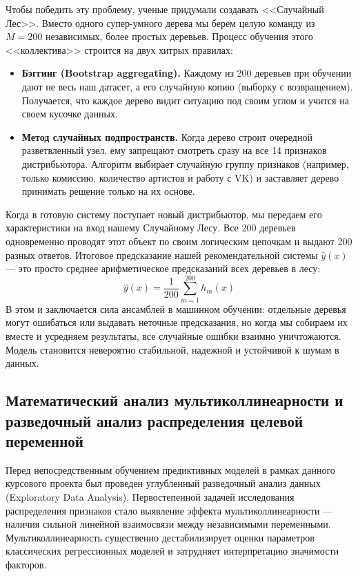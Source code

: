 \documentclass[14pt, a4paper]{extarticle}
\begin{document}
Чтобы победить эту проблему, ученые придумали создавать <<Случайный Лес>>. Вместо одного супер-умного дерева мы берем целую команду из $M = 200$ независимых, более простых деревьев. Процесс обучения этого <<коллектива>> строится на двух хитрых правилах:
\begin{itemize}
    \item \textbf{Бэггинг (Bootstrap aggregating).} Каждому из 200 деревьев при обучении дают не весь наш датасет, а его случайную копию (выборку с возвращением). Получается, что каждое дерево видит ситуацию под своим углом и учится на своем кусочке данных.
    \item \textbf{Метод случайных подпространств.} Когда дерево строит очередной разветвленный узел, ему запрещают смотреть сразу на все 14 признаков дистрибьютора. Алгоритм выбирает случайную группу признаков (например, только комиссию, количество артистов и работу с VK) и заставляет дерево принимать решение только на их основе.
\end{itemize}

Когда в готовую систему поступает новый дистрибьютор, мы передаем его характеристики на вход нашему Случайному Лесу. Все 200 деревьев одновременно проводят этот объект по своим логическим цепочкам и выдают 200 разных ответов. Итоговое предсказание нашей рекомендательной системы $\hat{y}(x)$ — это просто среднее арифметическое предсказаний всех деревьев в лесу:
\begin{equation}\label{rf_average_simple}
\hat{y}(x) = \frac{1}{200} \sum_{m=1}^{200} h_m(x)
\end{equation}
В этом и заключается сила ансамблей в машинном обучении: отдельные деревья могут ошибаться или выдавать неточные предсказания, но когда мы собираем их вместе и усредняем результаты, все случайные ошибки взаимно уничтожаются. Модель становится невероятно стабильной, надежной и устойчивой к шумам в данных.
\subsection{Математический анализ мультиколлинеарности и разведочный анализ распределения целевой переменной}

Перед непосредственным обучением предиктивных моделей в рамках данного курсового проекта был проведен углубленный разведочный анализ данных (Exploratory Data Analysis). Первостепенной задачей исследования распределения признаков стало выявление эффекта мультиколлинеарности --- наличия сильной линейной взаимосвязи между независимыми переменными. Мультиколлинеарность существенно дестабилизирует оценки параметров классических регрессионных моделей и затрудняет интерпретацию значимости факторов.
\end{document}
